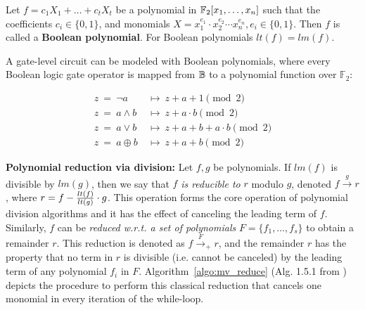 \begin{Definition} 
Let $f = c_1 X_1 + \dots + c_t X_t$ be a polynomial in
${\mathbb{F}}_2[x_1,\dots,x_n]$ such that the coefficients $c_i \in \{0, 1\}$,
and monomials $X = x_1^{e_{1}}\cdot x_2^{e_{2}}\cdots x_n^{e_{n}}, e_i
\in \{0,1\}$. 
Then $f$ is called a {\bf Boolean polynomial}. For Boolean polynomials
$lt(f) = lm(f)$. 
\end{Definition}


A gate-level circuit can be modeled with Boolean polynomials, where
every Boolean logic gate operator is mapped from ${\mathbb{B}}$ to a polynomial
function over ${\mathbb{F}}_2$: 

{\small
\begin{equation}
\label{b2poly}
\begin{split}
z ~ =  ~ \neg a ~ & \mapsto ~ z+a+1 \pmod 2  \\
z ~ =  ~ a \wedge b ~ & \mapsto ~ z+a\cdot b \pmod 2\\
z ~ =  ~ a \vee b ~ & \mapsto ~ z+a+b+a\cdot b \pmod 2 \\
z ~ =  ~ a \oplus b ~ & \mapsto ~ z+a+b \pmod 2 
\end{split}
\end{equation}
}


{\bf Polynomial reduction via division:} Let $f, g$ be polynomials. If
$lm(f)$ is divisible by $lm(g)$, then we say that $f$ {\it is
  reducible to} $r$ modulo $g$, denoted $f
\stackrel{g}{\textstyle\longrightarrow} r$, where $r = f - {lt(f)
  \over   lt(g)} \cdot g$. This operation forms the core operation of
polynomial division algorithms and it has the effect of canceling the
leading term of $f$. 
Similarly, $f$ can be {\it reduced 
w.r.t. a set of polynomials}  $F = \{f_1, \dots, f_s\}$ to obtain a
remainder $r$. This reduction is denoted as $f \stackrel{F} {\textstyle
  \longrightarrow}_+ r$, and the remainder $r$ has the property that
no term in $r$ is divisible (i.e. cannot be canceled) by the leading
term of any polynomial $f_i$ in $F$. Algorithm~\ref{algo:mv_reduce}
(Alg. 1.5.1 from \cite{gb_book}) depicts the procedure to perform this
classical reduction that cancels one monomial in every iteration of
the while-loop.   

